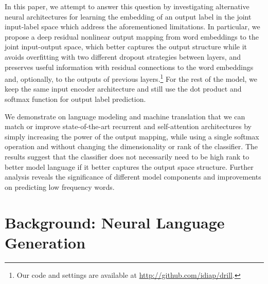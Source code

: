 \documentclass{article}
\begin{document}
In this paper, we attempt to answer this question by investigating alternative neural architectures for learning the embedding of an output label in the joint input-label space which address the aforementioned limitations. In particular, we propose a deep residual nonlinear output mapping from word embeddings to the joint input-output space, which better captures the output structure while it avoids overfitting with two different dropout strategies between layers, and preserves useful information with residual connections to the word embeddings and, optionally, to the outputs of previous layers.\footnote{Our code and settings are available at \url{http://github.com/idiap/drill}.} For the rest of the model, we keep the same input encoder architecture and still use the dot product and softmax function for output label prediction.  
 
We demonstrate on language modeling and machine translation that we can match or improve state-of-the-art recurrent and self-attention architectures by simply increasing the power of the output mapping, while using a single softmax operation and without changing the dimensionality or rank of the classifier. The results suggest that the classifier does not necessarily need to be high rank to better model language if it better captures the output space structure. Further analysis reveals the significance of different model components and  improvements on predicting low frequency words.
 
    

\section{Background: Neural Language Generation}
\label{background}
  
\end{document}
